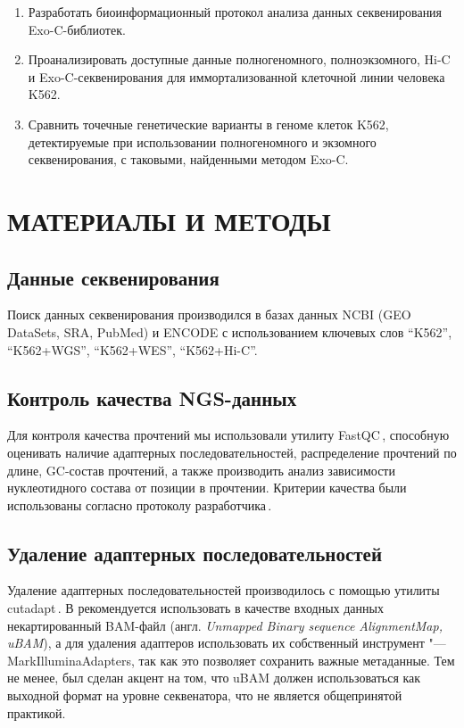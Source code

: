\documentclass[12pt, twoside, a4paper]{article}
\newcommand{\utilname}[1]{\textenglish{#1}}
\newcommand{\engterm}[1]{англ. \textenglish{\textit{#1}}}
\begin{document}
\begin{enumerate}
	\item Разработать биоинформационный протокол анализа данных секвенирования Exo-C-библиотек.
	\item Проанализировать доступные данные полногеномного, полноэкзомного, Hi-C и Exo-C-секвенирования для иммортализованной клеточной линии человека K562.
	\item Сравнить точечные генетические варианты в геноме клеток K562, детектируемые при использовании полногеномного и экзомного секвенирования, с таковыми, найденными методом Exo-C.
\end{enumerate} 

\section*{МАТЕРИАЛЫ И МЕТОДЫ}

\subsection{Данные секвенирования}
Поиск данных секвенирования производился в базах данных NCBI (GEO DataSets, SRA, PubMed) и ENCODE с использованием ключевых слов ``K562'', ``K562+WGS'', ``K562+WES'', ``K562+Hi-C''.

\subsection{Контроль качества NGS\hyp{}данных}
Для контроля качества прочтений мы использовали утилиту \utilname{FastQC}\,\cite{FastQC}, способную оценивать наличие адаптерных последовательностей, распределение прочтений по длине, GC-состав прочтений, а также производить анализ зависимости нуклеотидного состава от позиции в прочтении.
Критерии качества были использованы согласно протоколу разработчика\,\cite{FastQC}.

\subsection{Удаление адаптерных последовательностей}
Удаление адаптерных последовательностей производилось с помощью утилиты \utilname{cutadapt}\,\cite{Martin_2011}.
В \cite{Auwera_2013} рекомендуется использовать в качестве входных данных некартированный BAM-файл (\engterm{Unmapped Binary sequence Alignment\/Map, uBAM}), а для удаления адаптеров использовать их собственный инструмент "--- \utilname{MarkIlluminaAdapters}, так как это позволяет сохранить важные метаданные.
Тем не менее, был сделан акцент на том, что uBAM должен использоваться как выходной формат на уровне секвенатора, что не является общепринятой практикой.
\end{document}
